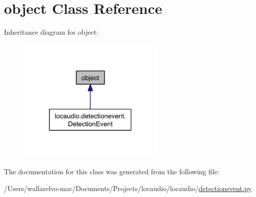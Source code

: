 \hypertarget{classobject}{\section{object Class Reference}
\label{classobject}
}


Inheritance diagram for object\-:\nopagebreak
\begin{figure}[H]
\begin{center}
\leavevmode
\includegraphics[width=202pt]{classobject__inherit__graph}
\end{center}
\end{figure}


The documentation for this class was generated from the following file\-:\begin{DoxyCompactItemize}
\item 
/\-Users/wallarelvo-\/mac/\-Documents/\-Projects/locaudio/locaudio/\hyperlink{detectionevent_8py}{detectionevent.\-py}\end{DoxyCompactItemize}
